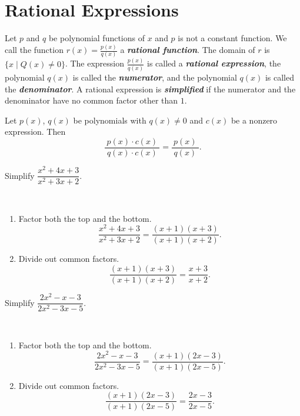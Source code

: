 \documentclass[en,11pt]{elegantbook}
\let\BeginKnitrBlock\begin \let\EndKnitrBlock\end
\begin{document}
\hypertarget{rational-expressions}{%
\section{Rational Expressions}\label{rational-expressions}}

Let \(p\) and \(q\) be polynomial functions of \(x\) and \(p\) is not a constant function. We call the function \(r(x)=\frac{p(x)}{q(x)}\) a \textbf{\emph{rational function}}. The domain of \(r\) is \(\{x\mid Q(x)\neq 0\}\).
The expression \(\frac{p(x)}{q(x)}\) is called a \textbf{\emph{rational expression}}, the polynomial \(q(x)\) is called the \textbf{\emph{numerator}}, and the polynomial \(q(x)\) is called the \textbf{\emph{denominator}}.
A rational expression is \textbf{\emph{simplified}} if the numerator and the denominator have no common factor other than \(1\).

Let \(p(x)\), \(q(x)\) be polynomials with \(q(x)\neq 0\) and \(c(x)\) be a nonzero expression. Then
\[
\dfrac{~p(x)\cdot c(x)~}{~q(x)\cdot c(x)~}=\dfrac{~p(x)~}{~q(x)~}.
\]

\BeginKnitrBlock{example}
\protect\hypertarget{exm:unnamed-chunk-32}{}{\label{exm:unnamed-chunk-32} }
Simplify \(\dfrac{x^2+4x+3}{x^2+3x+2}\).
\EndKnitrBlock{example}

\BeginKnitrBlock{solution}
{}\\

\begin{enumerate}
\def\labelenumi{\arabic{enumi}.}
\item
  Factor both the top and the bottom.
  \[
   \dfrac{x^2+4x+3}{x^2+3x+2}=\dfrac{(x+1)(x+3)}{(x+1)(x+2)}.
  \]
\item
  Divide out common factors.
  \[
   \dfrac{(x+1)(x+3)}{(x+1)(x+2)}=\dfrac{x+3}{x+2}.
  \]
\end{enumerate}
\EndKnitrBlock{solution}

\BeginKnitrBlock{example}
\protect\hypertarget{exm:unnamed-chunk-34}{}{\label{exm:unnamed-chunk-34} }
Simplify \(\dfrac{2x^2-x-3}{2x^2-3x-5}\).
\EndKnitrBlock{example}

\BeginKnitrBlock{solution}
{}\\

\begin{enumerate}
\def\labelenumi{\arabic{enumi}.}
\item
  Factor both the top and the bottom.
  \[\dfrac{2x^2-x-3}{2x^2-3x-5}=\dfrac{(x+1)(2x-3)}{(x+1)(2x-5)}.\]
\item
  Divide out common factors.
  \[\dfrac{(x+1)(2x-3)}{(x+1)(2x-5)}=\dfrac{2x-3}{2x-5}.\]
\end{enumerate}
\EndKnitrBlock{solution}
\end{document}

